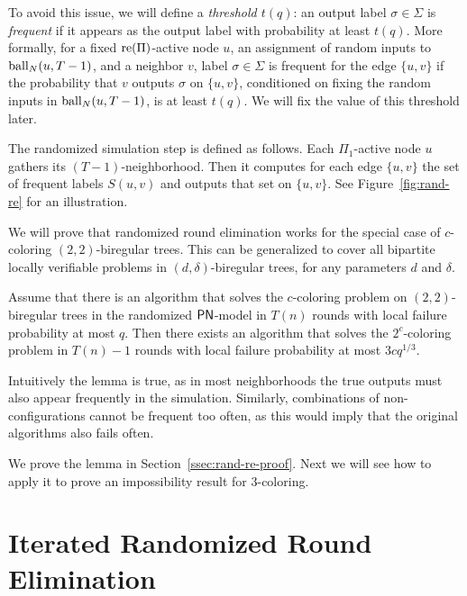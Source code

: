 To avoid this issue, we will define a \emph{threshold $t(q)$}: an output label $\sigma \in \Sigma$ is \emph{frequent} if it appears as the output label with probability at least $t(q)$. 
More formally, for a fixed $\operatorname{re}(\Pi)$-active node $u$, an assignment of random inputs to $\operatorname{ball}_N(u,T-1)$, and a neighbor $v$, label $\sigma \in \Sigma$ is frequent for the edge $\{ u, v \}$ if the probability that $v$ outputs $\sigma$ on $\{u,v\}$, conditioned on fixing the random inputs in $\operatorname{ball}_N(u, T-1)$, is at least $t(q)$. We will fix the value of this threshold later.

The randomized simulation step is defined as follows. Each $\Pi_1$-active node $u$ gathers its $(T-1)$-neighborhood. Then it computes for each edge $\{u,v\}$ the set of frequent labels $S(u,v)$ and outputs that set on $\{u,v\}$. See Figure~\ref{fig:rand-re} for an illustration.

We will prove that randomized round elimination works for the special case of $c$-coloring $(2,2)$-biregular trees. This can be generalized to cover all bipartite locally verifiable problems in $(d,\delta)$-biregular trees, for any parameters $d$ and $\delta$.

\begin{lemma} \label{lem:rand-re}
	Assume that there is an algorithm that solves the $c$-coloring problem on $(2,2)$-biregular trees in the randomized $\textup{\sffamily PN}$-model in $T(n)$ rounds with local failure probability at most $q$. Then there exists an algorithm that solves the $2^c$-coloring problem in $T(n)-1$ rounds with local failure probability at most $3cq^{1/3}$.
\end{lemma}

Intuitively the lemma is true, as in most neighborhoods the true outputs must also appear frequently in the simulation. Similarly, combinations of non-configurations cannot be frequent too often, as this would imply that the original algorithms also fails often.

We prove the lemma in Section~\ref{ssec:rand-re-proof}. Next we will see how to apply it to prove an impossibility result for 3-coloring.

\section{Iterated Randomized Round Elimination}

